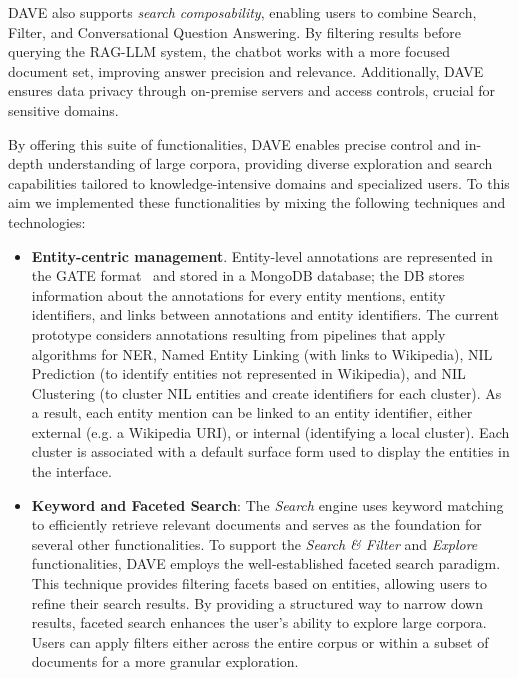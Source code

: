 DAVE also supports \textit{search composability}, enabling users to combine Search, Filter, and Conversational Question Answering. By filtering results before querying the RAG-LLM system, the chatbot works with a more focused document set, improving answer precision and relevance. Additionally, DAVE ensures data privacy through on-premise servers and access controls, crucial for sensitive domains.%

By offering this suite of functionalities, DAVE enables precise control and in-depth understanding of large corpora, providing diverse exploration and search capabilities tailored to knowledge-intensive domains and specialized users. To this aim we implemented these functionalities by mixing the following techniques and technologies: 

\begin{itemize}
    \item \textbf{Entity-centric management}. Entity-level annotations are represented in the GATE format~\cite{gate2002} and stored in a MongoDB database; the DB stores information about the annotations for every entity mentions, entity identifiers, and links between annotations and entity identifiers. The current prototype considers annotations resulting from pipelines that apply algorithms for NER, Named Entity Linking (with links to Wikipedia), NIL Prediction (to identify entities not represented in Wikipedia), and NIL Clustering (to cluster NIL entities and create identifiers for each cluster)\cite{pozzi2022,PozziRBP23,BELLANDI2024105904}. As a result, each entity mention can be linked to an entity identifier, either external (e.g. a Wikipedia URI), or internal (identifying a local cluster). Each cluster is associated with a default surface form used to display the entities in the interface.  
    
    \item \textbf{Keyword and Faceted Search}: The \textit{Search} engine uses keyword matching to efficiently retrieve relevant documents and serves as the foundation for several other functionalities.
    To support the \textit{Search \& Filter} and \textit{Explore} functionalities, DAVE employs the well-established faceted search paradigm. This technique provides filtering facets based on entities, allowing users to refine their search results. By providing a structured way to narrow down results, faceted search enhances the user's ability to explore large corpora. Users can apply filters either across the entire corpus or within a subset of documents for a more granular exploration.
    

\end{itemize}
